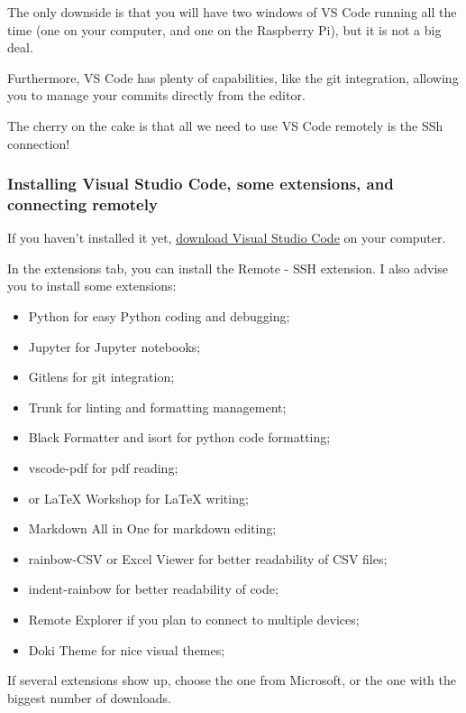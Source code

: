 \documentclass{article}
\begin{document}
The only downside is that you will have two windows of VS Code running all the time (one on your
computer, and one on the Raspberry Pi), but it is not a big deal.

Furthermore, VS Code has plenty of capabilities, like the git integration, allowing you to manage
your commits directly from the editor.

The cherry on the cake is that all we need to use VS Code remotely is the SSh connection!

\subsubsection{Installing Visual Studio Code, some extensions, and connecting remotely}

If you haven't installed it yet, \href{https://code.visualstudio.com/}{download Visual Studio Code}
on your computer.


In the extensions tab, you can install the Remote - SSH extension.
I also advise you to install some extensions:

\begin{itemize}
    \item Python for easy Python coding and debugging;
    \item Jupyter for Jupyter notebooks;
    \item Gitlens for git integration;
    \item Trunk for linting and formatting management;
    \item Black Formatter and isort for python code formatting;
    \item vscode-pdf for pdf reading;
    \item or LaTeX Workshop for LaTeX writing;
    \item Markdown All in One for markdown editing;
    \item rainbow-CSV or Excel Viewer for better readability of CSV files;
    \item indent-rainbow for better readability of code;
    \item Remote Explorer if you plan to connect to multiple devices;
    \item Doki Theme for nice visual themes;
\end{itemize}

If several extensions show up, choose the one from Microsoft, or the one with the biggest number of
downloads.
\end{document}
